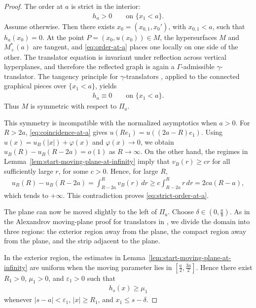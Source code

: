 \documentclass{amsart}
\theoremstyle{plain}
\theoremstyle{mainintrothm}
\theoremstyle{definition}
\begin{document}
\begin{proof}
	The order at $a$ is strict in the interior:
	\begin{align}
		\label{eq:strict-order-at-a}
		h_a>0
		\qquad
		\text{on }\{x_1<a\}.
	\end{align}
	Assume otherwise.  Then there exists $x_0=(x_{0,1},x_0')$, with
	$x_{0,1}<a$, such that $h_a(x_0)=0$.  At the point
	$P=(x_0,u(x_0))\in M$, the hypersurfaces $M$ and $M_+^*(a)$ are tangent, and
	\eqref{eq:order-at-a} places one locally on one side of the other.  The
	translator equation is invariant under reflection across vertical
	hyperplanes, and therefore the reflected graph is again a
	$\Gamma$-admissible $\gamma$-translator.  The tangency principle for
	$\gamma$-translators \cite[Theorem~1.4]{Yo}, applied to the connected
	graphical pieces over $\{x_1<a\}$, yields
	\begin{align}
		\label{eq:coincidence-at-a}
		h_a\equiv0
		\qquad
		\text{on }\{x_1<a\}.
	\end{align}
	Thus $M$ is symmetric with respect to $\Pi_a$.
	
	\medskip
	
	This symmetry is incompatible with the normalized asymptotics when $a>0$.
	For $R>2a$, \eqref{eq:coincidence-at-a} gives
	$u(Re_1)=u((2a-R)e_1)$.  Using
	$u(x)=u_B(|x|)+\varphi(x)$ and $\varphi(x)\to0$, we obtain
	$u_B(R)-u_B(R-2a)=o(1)$ as $R\to\infty$.  On the other hand, the regimes in
	Lemma~\ref{lem:start-moving-plane-at-infinity} imply that
	$v_B(r)\ge cr$ for all sufficiently large $r$, for some $c>0$.  Hence, for
	large $R$,
	\begin{align*}
		u_B(R)-u_B(R-2a)
		=
		\int_{R-2a}^{R}v_B(r)\,dr
		\ge
		c\int_{R-2a}^{R}r\,dr
		=
		2ca(R-a),
	\end{align*}
	which tends to $+\infty$.  This contradiction proves
	\eqref{eq:strict-order-at-a}.
	
	\medskip
	
	The plane can now be moved slightly to the left of $\Pi_a$.  Choose
	$\delta\in(0,\frac{a}{8})$.  As in the Alexandrov moving-plane proof for
	translators in \cite{Paco_2014}, we divide the domain into three regions: the
	exterior region away from the plane, the compact region away from the plane,
	and the strip adjacent to the plane.
	
	\medskip
	
	In the exterior region, the estimates in
	Lemma~\ref{lem:start-moving-plane-at-infinity} are uniform when the moving
	parameter lies in $[\frac{a}{2},\frac{3a}{2}]$.  Hence there exist
	$R_1>0$, $\mu_1>0$, and $\varepsilon_1>0$ such that
	\begin{align}
		\label{eq:outside-ball-order-near-a}
		h_s(x)\ge\mu_1
	\end{align}
	whenever $|s-a|<\varepsilon_1$, $|x|\ge R_1$, and $x_1\le s-\delta$.
	

\end{proof}
\end{document}
